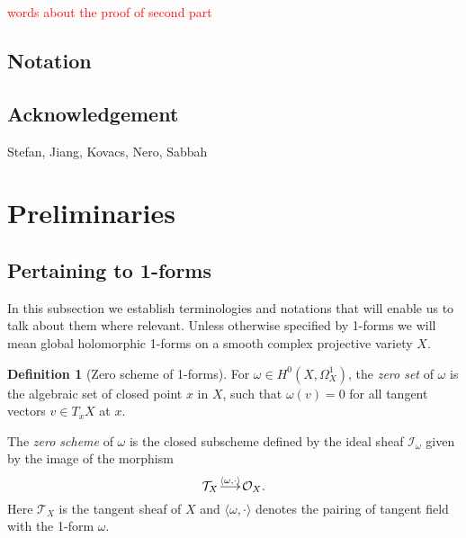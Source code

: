 \documentclass[a4paper,12pt,reqno]{amsart}
\makeatletter
\theoremstyle{plain}
\theoremstyle{definition}
\newtheorem{definition}[theorem]{Definition}
\theoremstyle{remark}
\renewcommand{\longrightarrow}{\xymatrix@1@=15pt{\ar[r]&}}
\newcommand{\sorry}[1]{\textcolor{red}{#1}}
\makeatother
\begin{document}
\sorry{words about the proof of second part}








\subsection*{Notation}

































\subsection*{Acknowledgement} 

Stefan, Jiang, Kovacs, Nero, Sabbah

\section{Preliminaries}

\subsection{Pertaining to 1-forms}
In this subsection we establish terminologies and notations that will enable us to talk about them where relevant. Unless otherwise
specified by 1-forms we will mean global holomorphic 1-forms on a smooth complex projective variety $X$.

\begin{definition}[Zero scheme of 1-forms]\label{def:zeroscheme}
For $\omega\in H^0(X, \Omega_X^1)$, the \emph{zero set} of $\omega$ is the algebraic set of closed point $x$ in $X$, such that $\omega(v)=0$
for all tangent vectors $v\in T_xX$ at $x$. 

The \emph{zero scheme} of $\omega$ is the closed subscheme defined by the ideal sheaf $\mathcal{I}_{\omega}$ given by the image of the morphism 
\[\mathcal{T}_X\overset{\langle\omega, \cdot\rangle}{\longrightarrow} \mathcal{O}_X.\] 
Here $\mathcal{T}_X$ is the tangent sheaf of $X$ and $\langle\omega, \cdot\rangle$ denotes the pairing of tangent field with 
the 1-form $\omega$.
\end{definition}
\end{document}
